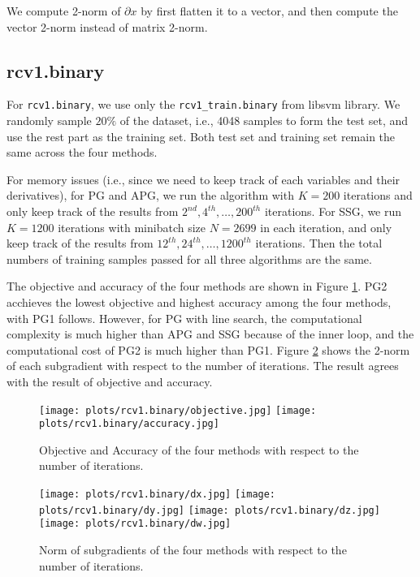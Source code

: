 \documentclass{article}
\numberwithin{equation}{section}
\numberwithin{figure}{section}
\begin{document}
We compute 2-norm of $\partial x$ by first flatten it to a vector, and then compute the vector 2-norm instead of matrix 2-norm. 

\subsection{rcv1.binary}
For \texttt{rcv1.binary}, we use only the \texttt{rcv1\_train.binary} from libsvm library. We randomly sample $20\%$ of the dataset, i.e., 4048 samples to form the test set, and use the rest part as the training set. Both test set and training set remain the same across the four methods.

For memory issues (i.e., since we need to keep track of each variables and their derivatives), for PG and APG, we run the algorithm with $K = 200$ iterations and only keep track of the results from $2^{nd}, 4^{th}, \hdots, 200^{th} $ iterations. For SSG, we run $K = 1200$ iterations with minibatch size $N = 2699$ in each iteration, and only keep track of the results from $12^{th}, 24^{th}, \hdots, 1200^{th} $ iterations. Then the total numbers of training samples passed for all three algorithms are the same.

The objective and accuracy of the four methods are shown in Figure \ref{rc1.binary-obj-acc}. PG2 acchieves the lowest objective and highest accuracy among the four methods, with PG1 follows. However, for PG with line search, the computational complexity is much higher than APG and SSG because of the inner loop, and the computational cost of PG2 is much higher than PG1. Figure \ref{rc1.binary-subgradient} shows the 2-norm of each subgradient with respect to the number of iterations. The result agrees with the result of objective and accuracy.

\begin{figure}[h]
\centering
\vbox{
	\texttt{[image: plots/rcv1.binary/objective.jpg]}
	\texttt{[image: plots/rcv1.binary/accuracy.jpg]}
}
\caption{Objective and Accuracy of the four methods with respect to the number of iterations.}
\label{rc1.binary-obj-acc}
\end{figure}

\begin{figure}[h]
\centering
\vbox{
	\texttt{[image: plots/rcv1.binary/dx.jpg]}
	\texttt{[image: plots/rcv1.binary/dy.jpg]}
	\texttt{[image: plots/rcv1.binary/dz.jpg]}
	\texttt{[image: plots/rcv1.binary/dw.jpg]}
}
\caption{Norm of subgradients of the four methods with respect to the number of iterations.}
\label{rc1.binary-subgradient}
\end{figure}
\end{document}
